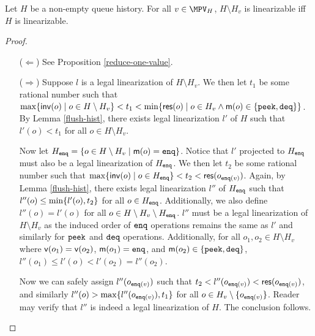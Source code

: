 \begin{lemma}\label{mpv-reduce}
    Let $H$ be a non-empty queue history. For all $v \in \MPV_H$, $H\setminus H_v$ is linearizable iff $H$ is linearizable.
\end{lemma}
\begin{proof}
\begin{itemize}
    \item[($\Leftarrow$)] See Proposition \ref{reduce-one-value}.
    \item[($\Rightarrow$)] Suppose $l$ is a legal linearization of $H\setminus H_v$. We then let $t_1$ be some rational number such that $\max\{{\sf inv}(o) \;|\; o \in H\setminus H_v\} < t_1 < \min\{{\sf res}(o) \;|\; o\in H_v \land {\sf m}(o) \in \{{\tt peek}, {\tt deq}\}\}$. By Lemma \ref{flush-hist}, there exists legal linearization $l'$ of $H$ such that $l'(o) < t_1$ for all $o\in H\setminus H_v$.
    
    Now let $H_{\tt enq} = \{o\in H\setminus H_v \;|\; {\sf m}(o) = {\tt enq}\}$. Notice that $l'$ projected to $H_{\tt enq}$ must also be a legal linearization of $H_{\tt enq}$. We then let $t_2$ be some rational number such that $\max\{{\sf inv}(o) \;|\; o \in H_{\tt enq}\} < t_2 < {\sf res}(o_{{\tt enq}(v)})$. Again, by Lemma \ref{flush-hist}, there exists legal linearization $l''$ of $H_{\tt enq}$ such that $l''(o) \leq \min\{l'(o), t_2\}$ for all $o\in H_{\tt enq}$. Additionally, we also define $l''(o) = l'(o)$ for all $o \in H\setminus H_v \setminus H_{\tt enq}$. $l''$ must be a legal linearization of $H\setminus H_v$ as the induced order of ${\tt enq}$ operations remains the same as $l'$ and similarly for ${\tt peek}$ and ${\tt deq}$ operations. Additionally, for all $o_1, o_2\in H \setminus H_v$ where ${\sf v}(o_1) = {\sf v}(o_2)$, ${\sf m}(o_1) = {\tt enq}$, and ${\sf m}(o_2) \in \{{\tt peek}, {\tt deq}\}$, $l''(o_1) \leq l'(o) < l'(o_2) = l''(o_2)$.

    Now we can safely assign $l''(o_{{\tt enq}(v)})$ such that $t_2 < l''(o_{{\tt enq}(v)}) < {\sf res}(o_{{\tt enq}(v)})$, and similarly $l''(o) > \max\{l''(o_{{\tt enq}(v)}), t_1\}$ for all $o \in H_v\setminus\{o_{{\tt enq}(v)}\}$. Reader may verify that $l''$ is indeed a legal linearization of $H$. The conclusion follows.
\end{itemize}
\end{proof}



